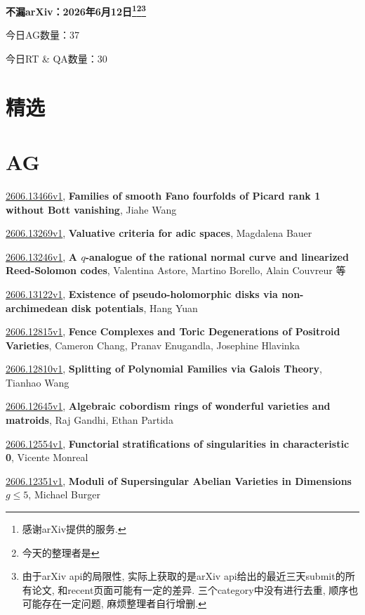 \documentclass[9pt, a4paper]{article}
\theoremstyle{plain}
\theoremstyle{definition}
\theoremstyle{remark}
\newcommand{\arxiv}[3]{\href{https://arxiv.org/abs/#1}{#1}, \textbf{\textcolor{arxivblue}{#2}}, #3}
\newcommand{\AGnumber}{37}
\newcommand{\RTQAnumber}{30}
\newcommand{\NewestDate}{2026年6月12日}
\newcommand{\todayarXiver}{} %
\begin{document}
\begin{center}
    \Huge\textbf{不漏arXiv：\NewestDate\footnote{感谢arXiv提供的服务.}\footnote{今天的整理者是\todayarXiver}\footnote{由于arXiv api的局限性, 实际上获取的是arXiv api给出的最近三天submit的所有论文, 和recent页面可能有一定的差异. 三个category中没有进行去重, 顺序也可能存在一定问题, 麻烦整理者自行增删.}} \\
\end{center}

\setcounter{section}{-1}

\begin{center}
    今日AG数量：\AGnumber
    
    今日RT \& QA数量：\RTQAnumber
    
\end{center}


\section{精选}


\section{AG}
\arxiv{2606.13466v1}{Families of smooth Fano fourfolds of Picard rank 1 without Bott vanishing}{Jiahe Wang}

\arxiv{2606.13269v1}{Valuative criteria for adic spaces}{Magdalena Bauer}

\arxiv{2606.13246v1}{A $q$-analogue of the rational normal curve and linearized Reed-Solomon codes}{Valentina Astore, Martino Borello, Alain Couvreur 等}

\arxiv{2606.13122v1}{Existence of pseudo-holomorphic disks via non-archimedean disk potentials}{Hang Yuan}

\arxiv{2606.12815v1}{Fence Complexes and Toric Degenerations of Positroid Varieties}{Cameron Chang, Pranav Enugandla, Josephine Hlavinka}

\arxiv{2606.12810v1}{Splitting of Polynomial Families via Galois Theory}{Tianhao Wang}

\arxiv{2606.12645v1}{Algebraic cobordism rings of wonderful varieties and matroids}{Raj Gandhi, Ethan Partida}

\arxiv{2606.12554v1}{Functorial stratifications of singularities in characteristic 0}{Vicente Monreal}

\arxiv{2606.12351v1}{Moduli of Supersingular Abelian Varieties in Dimensions $g\leq 5$}{Michael Burger}
\end{document}
